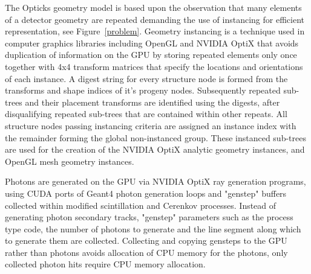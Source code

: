\documentclass{webofc}
\begin{document}
The Opticks geometry model is based upon the observation that many elements of a detector 
geometry are repeated demanding the use of instancing for efficient representation, see Figure~\ref{problem}. 
Geometry instancing is a technique used in computer graphics libraries including OpenGL and NVIDIA OptiX that avoids 
duplication of information on the GPU by storing repeated elements only once together with 4x4 transform matrices 
that specify the locations and orientations of each instance.
A digest string for every structure node is formed from the transforms and shape indices of it's progeny nodes. 
Subsequently repeated sub-trees and their placement transforms are identified using the digests, after disqualifying repeated sub-trees
that are contained within other repeats. 
All structure nodes passing instancing criteria are assigned an instance index
with the remainder forming the global non-instanced group. 
These instanced sub-trees are used for the creation of the NVIDIA OptiX analytic geometry instances, and OpenGL mesh geometry instances.  
%
%
%
%
%
%
%

Photons are generated on the GPU via NVIDIA OptiX ray generation programs, 
using CUDA ports of Geant4 photon generation loops and "genstep" buffers  
collected within modified scintillation and Cerenkov processes. 
%
Instead of generating photon secondary tracks, "genstep" parameters such as   
the process type code, the number of photons to generate and the line segment along which to generate
them are collected. 
Collecting and copying gensteps to the GPU rather than photons avoids
allocation of CPU memory for the photons, only collected photon hits 
require CPU memory allocation. 
%
%
\end{document}
